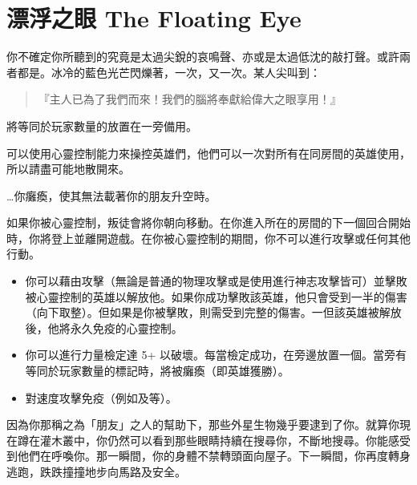
\chapter{漂浮之眼 The Floating Eye}

\begin{HauntStory}
	你不確定你所聽到的究竟是太過尖銳的哀鳴聲、亦或是太過低沈的敲打聲。或許兩者都是。冰冷的藍色光芒閃爍著，一次，又一次。某人尖叫到：
	\begin{quote}
		『主人已為了我們而來！我們的腦將奉獻給偉大之眼享用！』
	\end{quote}
\end{HauntStory}

將等同於玩家數量的放置在一旁備用。

可以使用心靈控制能力來操控英雄們，他們可以一次對所有在同房間的英雄使用，所以請盡可能地散開來。

…你癱瘓，使其無法載著你的朋友升空時。

如果你被心靈控制，叛徒會將你朝向移動。在你進入所在的房間的下一個回合開始時，你將登上並離開遊戲。在你被心靈控制的期間，你不可以進行攻擊或任何其他行動。

\vfill\null\pagebreak

\vspace*{-1em}
\begin{itemize}
	\item 你可以藉由攻擊（無論是普通的物理攻擊或是使用進行神志攻擊皆可）並擊敗被心靈控制的英雄以解放他。如果你成功擊敗該英雄，他只會受到一半的傷害（向下取整）。但如果是你被擊敗，則需受到完整的傷害。一但該英雄被解放後，他將永久免疫的心靈控制。
	\item 你可以進行力量檢定達 5+ 以破壞。每當檢定成功，在旁邊放置一個。當旁有等同於玩家數量的標記時，將被癱瘓（即英雄獲勝）。
	\item {}對速度攻擊免疫（例如及等）。
\end{itemize}

\begin{HauntStory}
	因為你那稱之為「朋友」之人的幫助下，那些外星生物幾乎要逮到了你。就算你現在蹲在灌木叢中，你仍然可以看到那些眼睛持續在搜尋你，不斷地搜尋。你能感受到他們在呼喚你。那一瞬間，你的身體不禁轉頭面向屋子。下一瞬間，你再度轉身逃跑，跌跌撞撞地步向馬路及安全。
\end{HauntStory}
